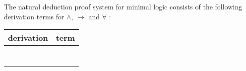 \begin{mydef} 
The natural deduction proof system for minimal logic  consists of the following derivation terms for $\wedge$, $\to$ and $\forall$ : \\
\begin{center}
\centering
\begin{tabular}{| c | c |} \hline
derivation & term \\
\hline 
\raisebox{-1\height}{$u:A$} & \raisebox{-1\height}{$u^A$} \\ [3ex] \hline
\raisebox{-1.2\height}{
\AxiomC{$|M$}
\noLine
\UnaryInfC{$A$}
\AxiomC{$|N$}
\noLine
\UnaryInfC{$B $}
\RightLabel{$\wedge^+$}
\BinaryInfC{$A \wedge B$}
\DisplayProof} &  \raisebox{-2.8\height}{$\langle M^A, N^B \rangle^{A \wedge B}$} \\ [10ex]  \hline
\raisebox{-1.5\height}{
\AxiomC{$|M$}
\noLine
\UnaryInfC{$A \wedge B$}
\RightLabel{$\wedge^-_0$}
\UnaryInfC{$A$}
\DisplayProof \hspace{10pt}
\AxiomC{$|M$}
\noLine
\UnaryInfC{$A \wedge B$}
\RightLabel{$\wedge^-_1$}
\UnaryInfC{$A$}
\DisplayProof} & \raisebox{-2.8\height}{$(M^{A \wedge B} 0)^A \quad (M^{A \wedge B} 1)^B$} \\ [10ex] \hline

\raisebox{-1\height}{
\AxiomC{$\mathass{u: \,A}$}
\noLine
\UnaryInfC{$| \,M$}
\noLine
\UnaryInfC{$B$}
\RightLabel{$\to^+$}
\UnaryInfC{$A \to B$}
\DisplayProof} & \raisebox{-3.2\height}{$(\lambda u^AM^B)^{A \to B}$} \\ [12ex] \hline

\raisebox{-1\height}{
\AxiomC{$|M$}
\noLine
\UnaryInfC{$A \to B$}
\AxiomC{$|N$}
\noLine
\UnaryInfC{$A$}
\RightLabel{$\to^-$}
\BinaryInfC{$B$}
\DisplayProof} & \raisebox{-1.2\height}{$(M^{A \to B} N^{A})^B$} \\ [5ex] \hline

\raisebox{-1\height}{
\AxiomC{$|M$}
\noLine
\UnaryInfC{$A$}
\RightLabel{$\forall^+x \ (var.cond.)$}
\UnaryInfC{$\forall x A$}
\DisplayProof} & \raisebox{-2.8\height}{$(\lambda x M^A)^{\forall x A} \, (var.cond.)$}  \\ [10ex] \hline

\raisebox{-1\height}{
\AxiomC{$|M$}
\noLine
\UnaryInfC{$\forall x. A$}
\AxiomC{t}
\RightLabel{$\forall^-$}
\BinaryInfC{$A[x:=t]$}
\DisplayProof} & \raisebox{-2.8\height}{$(M^{\forall x A}t)^{A[x:=t]}$} \\ [10ex] \hline

\end{tabular}
\end{center}

\end{mydef}



